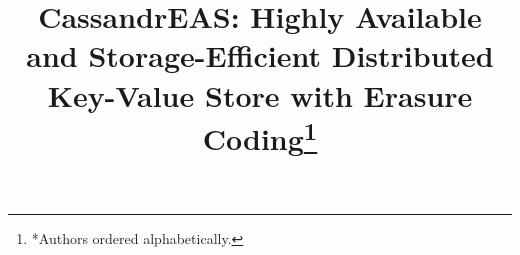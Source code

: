 \documentclass[conference]{IEEEtran}
\newcommand{\treasmod}{{\sc Treas-opt}}
\begin{document}
	\date{}
	
	\title{CassandrEAS: Highly Available and Storage-Efficient Distributed Key-Value Store with Erasure Coding\thanks{*Authors ordered alphabetically.}}
	
\end{document}
